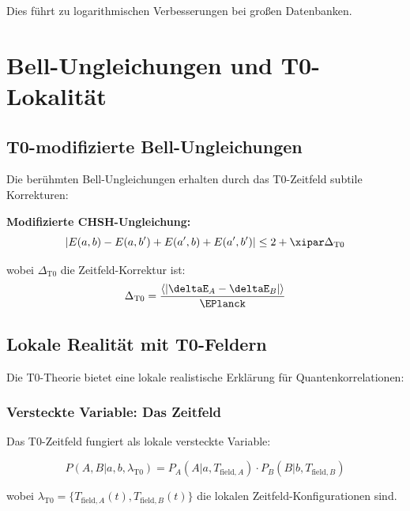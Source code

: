 	Dies führt zu logarithmischen Verbesserungen bei großen Datenbanken.
	
	\section{Bell-Ungleichungen und T0-Lokalität}
	
	\subsection{T0-modifizierte Bell-Ungleichungen}
	
	Die berühmten Bell-Ungleichungen erhalten durch das T0-Zeitfeld subtile Korrekturen:
	
	\begin{tcolorbox}[colback=red!5!white,colframe=red!75!black,title=T0-Bell-Korrekturen]
		\textbf{Modifizierte CHSH-Ungleichung:}
		\begin{equation}
			|E(a,b) - E(a,b') + E(a',b) + E(a',b')| \leq 2 + \xipar \Delta_{\text{T0}}
		\end{equation}
		
		wobei $\Delta_{\text{T0}}$ die Zeitfeld-Korrektur ist:
		\begin{equation}
			\Delta_{\text{T0}} = \frac{\langle|\deltaE_A - \deltaE_B|\rangle}{\EPlanck}
		\end{equation}
	\end{tcolorbox}
	
	\subsection{Lokale Realität mit T0-Feldern}
	
	Die T0-Theorie bietet eine lokale realistische Erklärung für Quantenkorrelationen:
	
	\subsubsection{Versteckte Variable: Das Zeitfeld}
	
	Das T0-Zeitfeld fungiert als lokale versteckte Variable:
	
	\begin{equation}
		P(A,B|a,b,\lambda_{\text{T0}}) = P_A(A|a,T_{\text{field},A}) \cdot P_B(B|b,T_{\text{field},B})
	\end{equation}
	
	wobei $\lambda_{\text{T0}} = \{T_{\text{field},A}(t), T_{\text{field},B}(t)\}$ die lokalen Zeitfeld-Konfigurationen sind.
	
